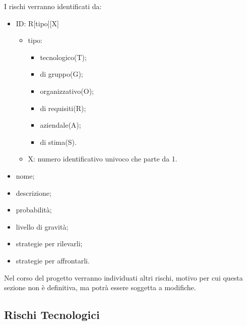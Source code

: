 I rischi verranno identificati da:
\begin{itemize}
    \item ID: R[tipo][X]
    \begin{itemize}
        \item tipo:
        \begin{itemize}
            \item tecnologico(T);
            \item di gruppo(G);
            \item organizzativo(O);
            \item di requisiti(R);
            \item aziendale(A);
            \item di stima(S).
        \end{itemize}
        \item X: numero identificativo univoco che parte da 1.
    \end{itemize}
    \item nome;
    \item descrizione;
    \item probabilità;
    \item livello di gravità;
    \item strategie per rilevarli;
    \item strategie per affrontarli.
\end{itemize}
Nel corso del progetto verranno individuati altri rischi, motivo per cui questa sezione
non è definitiva, ma potrà essere soggetta a modifiche.
\pagebreak
\subsection{Rischi Tecnologici}

